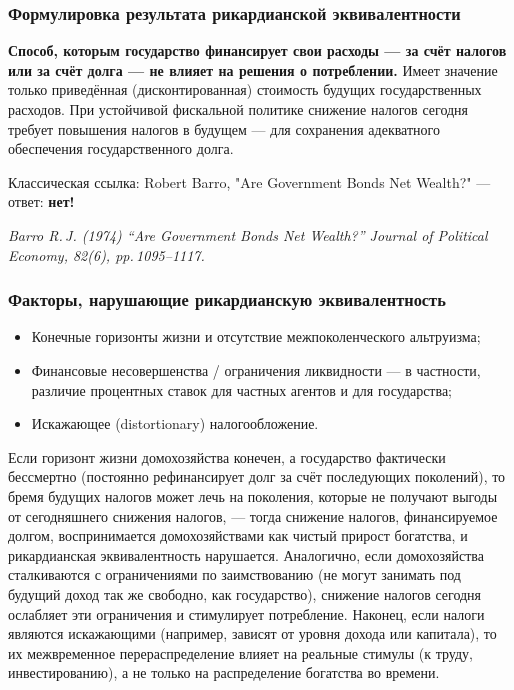 \documentclass[10pt,a4paper]{article}
\begin{document}
\subsubsection{Формулировка результата рикардианской эквивалентности}
 
\textbf{Способ, которым государство финансирует свои расходы — за счёт налогов или за счёт долга — не влияет на решения о потреблении.} Имеет значение только приведённая (дисконтированная) стоимость будущих государственных расходов. При устойчивой фискальной политике снижение налогов сегодня требует повышения налогов в будущем — для сохранения адекватного обеспечения государственного долга.
 
Классическая ссылка: Robert Barro, "Are Government Bonds Net Wealth?" — ответ: \textbf{нет!}
\begin{center}
\textit{Barro R.\,J. (1974) ``Are Government Bonds Net Wealth?'' Journal of Political Economy, 82(6), pp.\,1095--1117.}
\end{center}
 
\subsubsection{Факторы, нарушающие рикардианскую эквивалентность}
 
\begin{itemize}
\item Конечные горизонты жизни и отсутствие межпоколенческого альтруизма;
\item Финансовые несовершенства / ограничения ликвидности — в частности, различие процентных ставок для частных агентов и для государства;
\item Искажающее (distortionary) налогообложение.
\end{itemize}
 
\begin{intuition}
Если горизонт жизни домохозяйства конечен, а государство фактически бессмертно (постоянно рефинансирует долг за счёт последующих поколений), то бремя будущих налогов может лечь на поколения, которые не получают выгоды от сегодняшнего снижения налогов, — тогда снижение налогов, финансируемое долгом, воспринимается домохозяйствами как чистый прирост богатства, и рикардианская эквивалентность нарушается. Аналогично, если домохозяйства сталкиваются с ограничениями по заимствованию (не могут занимать под будущий доход так же свободно, как государство), снижение налогов сегодня ослабляет эти ограничения и стимулирует потребление. Наконец, если налоги являются искажающими (например, зависят от уровня дохода или капитала), то их межвременное перераспределение влияет на реальные стимулы (к труду, инвестированию), а не только на распределение богатства во времени.
\end{intuition}
 
\end{document}
